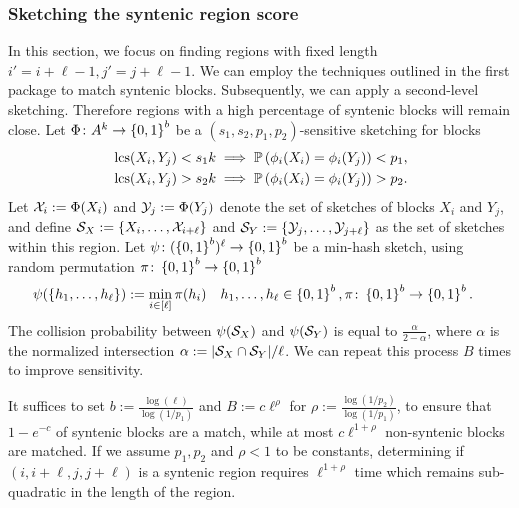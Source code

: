 \subsubsection*{Sketching the syntenic region score}
In this section, we focus on finding regions with fixed length $i'=i+\ell-1, j'=j+\ell-1$.  
We can employ the techniques outlined in the first package to match syntenic blocks. Subsequently, we can apply a second-level sketching. Therefore regions with a high percentage of syntenic blocks will remain close. Let $\Phi\colon A^k\to \left\{0,1\right\}^b$ be a $(s_1,s_2, p_1, p_2)$-sensitive sketching for blocks
\begin{align}
    &\operatorname{\mathrm{lcs}}(X_i,Y_j)<s_1 k \implies \mathbb{P}\left( \phi_i(X_i)=\phi_i(Y_j) \right) < p_1, \\
    &\operatorname{\mathrm{lcs}}(X_i,Y_j)>s_2 k \implies \mathbb{P}\left( \phi_i(X_i)=\phi_i(Y_j) \right) > p_2.
\end{align}
Let $\mathcal{X}_i:=\Phi(X_i)$ and $\mathcal{Y}_j:=\Phi(Y_j)$ denote the set of sketches of blocks $X_i$ and $Y_j$, and define 
$\mathcal{S}_X:=\left\{X_i,\dots,\mathcal{X}_{i+\ell}\right\}$ and $\mathcal{S}_Y:=\left\{\mathcal{Y}_j, \dots, \mathcal{Y}_{j+\ell}\right\}$ as the set of sketches within this region. 
Let $\psi\colon (\left\{0,1\right\}^b)^\ell\to\left\{0,1\right\}^b$ be a min-hash sketch, using random permutation $\pi\colon\left\{0,1\right\}^b\to\left\{0,1\right\}^b$
\begin{align}
    &\psi(\left\{h_1,\dots,h_\ell\right\}):=\min_{i\in[\ell]} \pi(h_i)  && h_1,\dots, h_\ell\in \left\{0,1\right\}^b, \pi\colon \left\{0,1\right\}^b\to \left\{0,1\right\}^b.
\end{align}
The collision probability between $\psi(\mathcal{S}_X)$ and $\psi(\mathcal{S}_Y)$ is equal to $\frac{\alpha}{2-\alpha}$, where $\alpha$ is the normalized intersection $\alpha:=|\mathcal{S}_X\cap \mathcal{S}_Y|/\ell$. We can repeat this process $B$ times to improve sensitivity. 

It suffices to set $b:=\frac{\log(\ell)}{\log(1/p_1)}$ and $B:=c \ell^\rho$ for $\rho:=\frac{\log(1/p_2)}{\log(1/p_1)}$, to ensure that $1-e^{-c}$ of syntenic blocks are a match, while at most $c \ell^{1+\rho} $ non-syntenic blocks are matched. If we assume $p_1, p_2$ and $\rho < 1$ to be constants, determining if $(i,i+\ell, j, j+\ell)$ is a syntenic region requires $\ell^{1+\rho}$ time which remains sub-quadratic in the length of the region.  

